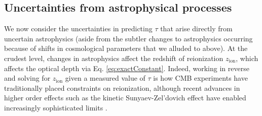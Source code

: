 \documentclass[twocolumn,aps,prd,nofootinbib,showpacs]{revtex4-1}
\begin{document}
\subsection{Uncertainties from astrophysical processes}
\label{sec:astroUncertainties}

We now consider the uncertainties in predicting $\tau$ that arise directly from uncertain astrophysics (aside from the subtler changes to astrophysics occurring because of shifts in cosmological parameters that we alluded to above). At the crudest level, changes in astrophysics affect the redshift of reionization $z_\textrm{ion}$, which affects the optical depth via Eq. \eqref{eq:exactConstant}. Indeed, working in reverse and solving for $z_\textrm{ion}$ given a measured value of $\tau$ is how CMB experiments have traditionally placed constraints on reionization, although recent advances in higher order effects such as the kinetic Sunyaev-Zel'dovich effect have enabled increasingly sophisticated limits \cite{zahn_et_al2012,sievers_et_al2013,george_et_al2015}.
\end{document}

